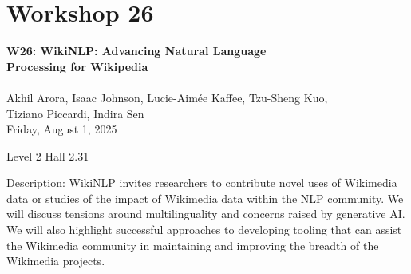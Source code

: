\clearpage


\section[W26: WikiNLP: Advancing Natural Language Processing for Wikipedia]{Workshop 26}
\label{workshop_26}

\begin{center}
    {\Large \textbf{W26: WikiNLP: Advancing Natural Language \\
    Processing for Wikipedia}}\\
    
\\

Akhil Arora, Isaac Johnson, Lucie-Aimée Kaffee, Tzu-Sheng Kuo, \\
Tiziano Piccardi, Indira Sen\\

    Friday, August 1, 2025

Level 2 Hall 2.31
    
\end{center}

Description: WikiNLP invites researchers to contribute novel uses of Wikimedia data or studies of the impact of Wikimedia data within the NLP community. We will discuss tensions around multilinguality and concerns raised by generative AI. We will also highlight successful approaches to developing tooling that can assist the Wikimedia community in maintaining and improving the breadth of the Wikimedia projects.

